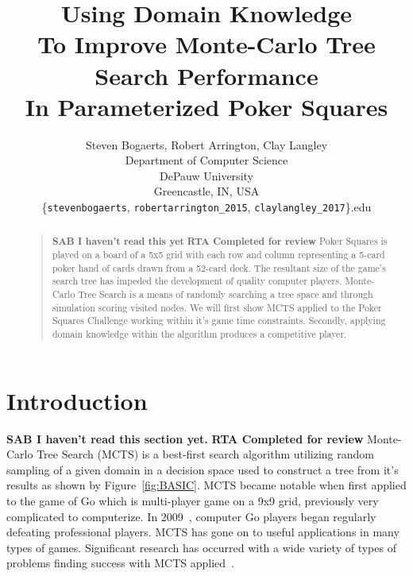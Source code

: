 \documentclass[letterpaper]{article}
\begin{document}
%
\title{Using Domain Knowledge\\To Improve Monte-Carlo Tree Search Performance\\In Parameterized Poker Squares}    %
\author{Steven Bogaerts, Robert Arrington, Clay Langley\\
Department of Computer Science\\
DePauw University\\
Greencastle, IN, USA\\
\{{\tt stevenbogaerts}, {\tt robertarrington\_2015}, {\tt claylangley\_2017}\}{\tt@depauw.edu}
}
\maketitle
\begin{abstract}
\begin{quote}
{\bf SAB I haven't read this yet}
{\bf RTA Completed for review}
Poker Squares is played on a board of a 5x5 grid with each row and column representing a 5-card poker hand of cards drawn from a 52-card deck. The resultant size of the game's search tree has impeded the development of quality computer players. Monte-Carlo Tree Search is a means of randomly searching a tree space and through simulation scoring visited nodes. We will first show MCTS applied to the Poker Squares Challenge working within it's game time constraints. Secondly, applying domain knowledge within the algorithm produces a competitive player.
\end{quote}
\end{abstract}

\section{Introduction}
{\bf SAB I haven't read this section yet.}
{\bf RTA Completed for review}
Monte-Carlo Tree Search (MCTS) is a best-first search algorithm utilizing random sampling of a given domain in a decision space used to construct a tree from it's results as shown by Figure~\ref{fig:BASIC}. MCTS became notable when first applied to the game of Go which is multi-player game on a 9x9 grid, previously very complicated to computerize. In 2009~\cite{chaslot2008monte}, computer Go players began regularly defeating professional players. MCTS has gone on to useful applications in many types of games. Significant research has occurred with a wide variety of types of problems finding success with MCTS applied~\cite{browne2010monte}.
\end{document}
